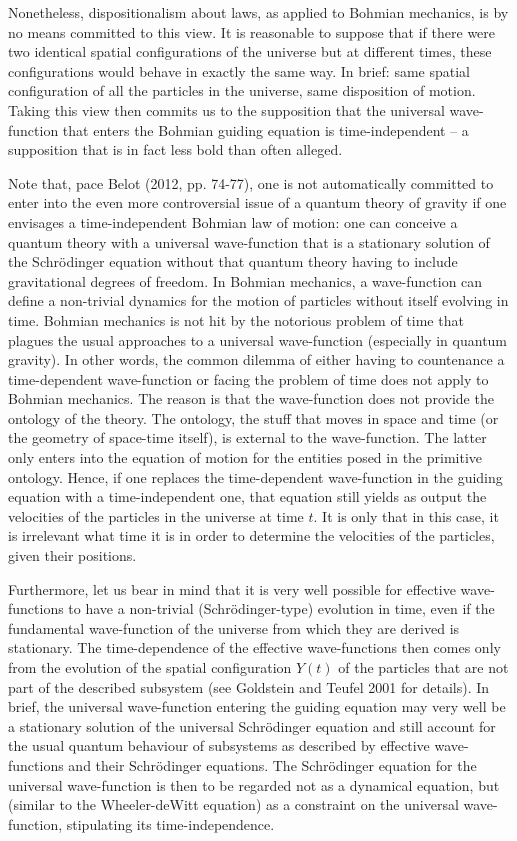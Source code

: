 \documentclass[12pt,a4paper]{article}
\theoremstyle{definition}
\begin{document}
Nonetheless, dispositionalism about laws, as applied to Bohmian mechanics, is by no means committed to this view. It is reasonable to suppose that if there were two identical spatial configurations of the universe but at different times, these configurations would behave in exactly the same way. In brief: same spatial configuration of all the particles in the universe, same disposition of motion. Taking this view then commits us to the supposition that the universal wave-function that enters the Bohmian guiding equation is time-independent -- a supposition that is in fact less bold than often alleged.

Note that, pace Belot (2012, pp. 74-77), one is not automatically committed to enter into the even more controversial issue of a quantum theory of gravity if one envisages a time-independent Bohmian law of motion: one can conceive a quantum theory with a universal wave-function that is a stationary solution of the Schr\"odinger equation without that quantum theory having to include gravitational degrees of freedom. In Bohmian mechanics, a wave-function can define a non-trivial dynamics for the motion of particles without itself evolving in time. Bohmian mechanics is not hit by the notorious problem of time that plagues the usual approaches to a universal wave-function (especially in quantum gravity). In other words, the common dilemma of either having to countenance a time-dependent wave-function or facing the problem of time does not apply to Bohmian mechanics. The reason is that the wave-function does not provide the ontology of the theory. The ontology, the stuff that moves in space and time (or the geometry of space-time itself), is external to the wave-function. The latter only enters into the equation of motion for the entities posed in the primitive ontology. Hence, if one replaces the time-dependent wave-function in the guiding equation with a time-independent one, that equation still yields as output the velocities of the particles in the universe at time $t$. It is only that in this case, it is irrelevant what time it is in order to determine the velocities of the particles, given their positions.

Furthermore, let us bear in mind that it is very well possible for effective wave-functions to have a non-trivial (Schr\"odinger-type) evolution in time, even if the fundamental wave-function of the universe from which they are derived is stationary. The time-dependence of the effective wave-functions then comes only from the evolution of the spatial configuration $Y(t)$ of the particles that are not part of the described subsystem (see Goldstein and Teufel 2001 for details). In brief, the universal wave-function entering the guiding equation may very well be a stationary solution of the universal Schr\"odinger equation and still account for the usual quantum behaviour of subsystems as described by effective wave-functions and their Schr\"odinger equations. The Schr\"odinger equation for the universal wave-function is then to be regarded not as a dynamical equation, but (similar to the Wheeler-deWitt equation) as a constraint on the universal wave-function, stipulating its time-independence.
\end{document}
